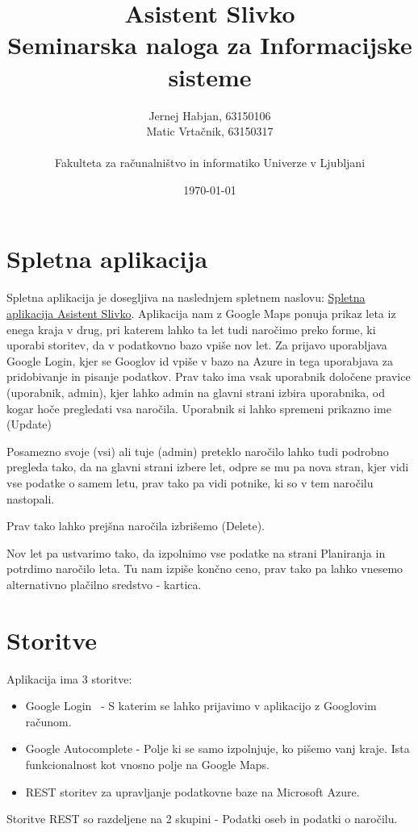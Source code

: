 \documentclass[11pt,a4paper]{article}
\title{Asistent Slivko \\
\large Seminarska naloga za Informacijske sisteme}
\author{
Jernej Habjan, 63150106  \\
Matic Vrtačnik, 63150317 \\
\ \\
Fakulteta za računalništvo in informatiko Univerze v Ljubljani
\date{\today}         
}
\begin{document}
\maketitle



\section{Spletna aplikacija}

Spletna aplikacija je dosegljiva na naslednjem spletnem naslovu: 
\href{http://asistentslivko.azurewebsites.net/}{Spletna aplikacija Asistent Slivko}.
Aplikacija nam z Google Maps ponuja prikaz leta iz enega kraja v drug, pri katerem lahko ta let tudi naročimo preko forme, ki uporabi storitev, da v podatkovno bazo vpiše nov let.
Za prijavo uporabljava Google Login, kjer se Googlov id vpiše v bazo na Azure in tega uporabjava za pridobivanje in pisanje podatkov.
Prav tako ima vsak uporabnik določene pravice (uporabnik, admin), kjer lahko admin na glavni strani izbira uporabnika, od kogar hoče pregledati vsa naročila.
Uporabnik si lahko spremeni prikazno ime (Update)

Posamezno svoje (vsi) ali tuje (admin) preteklo naročilo lahko tudi podrobno pregleda tako, da na glavni strani izbere let, odpre se mu pa nova stran, kjer vidi vse podatke o samem letu, prav tako pa vidi potnike, ki so v tem naročilu nastopali.

Prav tako lahko prejšna naročila izbrišemo (Delete).

Nov let pa ustvarimo tako, da izpolnimo vse podatke na strani Planiranja in potrdimo naročilo leta. Tu nam izpiše končno ceno, prav tako pa lahko vnesemo alternativno plačilno sredstvo - kartica.

\section{Storitve}
Aplikacija ima 3 storitve:
\begin{itemize}
	\item Google Login~\cite{signIn} - S katerim se lahko prijavimo v aplikacijo z Googlovim računom.
	\item Google Autocomplete\cite{autocomplete} - Polje ki se samo izpolnjuje, ko pišemo vanj kraje. Ista funkcionalnost kot vnosno polje na Google Maps.
	\item REST storitev za upravljanje podatkovne baze na Microsoft Azure.
\end{itemize}
Storitve REST so razdeljene na 2 skupini - Podatki oseb in podatki o naročilu.
\end{document}
